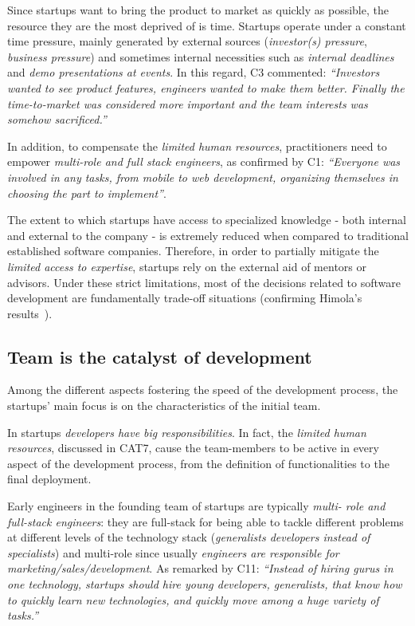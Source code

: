 \documentclass[10pt,journal,letterpaper,compsoc]{IEEEtran}
\begin{document}
Since startups want to bring the product to market as quickly as possible, the
resource they are the most deprived of is time. Startups operate under a
constant time pressure, mainly generated by external sources
(\textit{investor(s) pressure}, \textit{business pressure}) and sometimes
internal necessities such as \textit{internal deadlines} and \textit{demo
presentations at events}. In this regard, C3 commented: \textit{``Investors
wanted to see product features, engineers wanted to make them better. Finally
the time-to-market was considered more important and the team interests was
somehow sacrificed.''}

In addition, to compensate the \textit{limited human resources}, practitioners
need to empower \textit{multi-role and full stack engineers}, as confirmed by
C1: \textit{``Everyone was involved in any tasks, from mobile to web
development, organizing themselves in choosing the part to implement''}.

The extent to which startups have access to specialized knowledge - both
internal and external to the company - is extremely reduced when compared to
traditional established software companies. Therefore, in order to partially
mitigate the \textit{limited access to expertise}, startups rely on the external
aid of mentors or advisors. Under these strict limitations, most of the
decisions related to software development are fundamentally trade-off
situations (confirming Himola's results~\cite{Hilmola2003}).
\subsection{Team is the catalyst of development} \label{res:gsm:cat4} 
Among the different aspects fostering the speed of the development process, 
the startups' main focus is on the characteristics of the initial team.

In startups \textit{developers have big responsibilities}. In fact, the
\textit{limited human resources}, discussed in CAT7, cause the team-members to
be active in every aspect of the development process, from the definition of
functionalities to the final deployment.

Early engineers in the founding team of startups are typically \textit{multi-
role and full-stack engineers}: they are full-stack for being able to tackle
different problems at different levels of the technology stack
(\textit{generalists developers instead of specialists}) and multi-role since
usually \textit{engineers are responsible for marketing/sales/development}. As
remarked by C11: \textit{``Instead of hiring gurus in one technology, startups
should hire young developers, generalists, that know how to quickly learn new
technologies, and quickly move among a huge variety of tasks.''}
\end{document}

